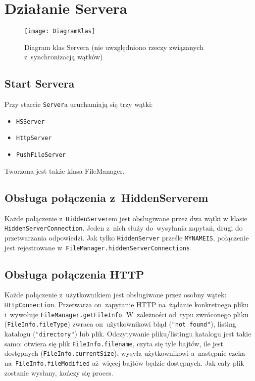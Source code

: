 \documentclass[a4paper,notitlepage]{article}
\begin{document}
\pagestyle{fancy}
\tableofcontents
\section{Działanie Servera}
\begin{figure}
\texttt{[image: DiagramKlas]}
\caption{Diagram klas Servera (nie uwzględniono rzeczy związanych 
z~synchronizacją wątków)}
\end{figure}
\subsection{Start Servera}
Przy starcie \texttt{Server}a uruchamiają się trzy wątki: 
\begin{itemize}
\item \texttt{HSServer}
\item \texttt{HttpServer}
\item \texttt{PushFileServer}
\end{itemize}
Tworzona jest także klasa FileManager.

\subsection{Obsługa połączenia z~HiddenServerem}
Każde połączenie z~\texttt{HiddenServer}em jest obsługiwane przez 
dwa wątki w klasie \texttt{HiddenServerConnection}. Jeden z~nich służy 
do~wysyłania zapytań, drugi do przetwarzania odpowiedzi.
Jak tylko \texttt{HiddenServer} prześle \texttt{MYNAMEIS},
połączenie jest rejestrowane w~\texttt{FileManager.hiddenServerConnections}.

\subsection{Obsługa połączenia HTTP}
Każde połączenie z~użytkownikiem jest obsługiwane przez osobny wątek: 
\texttt{HttpConnection}. Przetwarza on~zapytanie HTTP na~żądanie konkretnego
pliku i~wywołuje \texttt{FileManager.getFileInfo}. W~zależności od~typu 
zwróconego pliku (\texttt{FileInfo.fileType}) zwraca on~użytkownikowi błąd 
(\texttt{"not found"}), listing katalogu (\texttt{"directory"}) lub plik.
Odczytywanie pliku/listingu katalogu jest takie samo:
otwiera się plik \texttt{FileInfo.filename}, czyta się tyle bajtów, ile jest
dostępnych (\texttt{FileInfo.currentSize}), wysyła użytkownikowi a~następnie 
czeka na~\texttt{FileInfo.fileModified} aż~więcej bajtów będzie dostępnych. 
Jak cały plik zostanie wysłany, kończy się proces.
\end{document}
